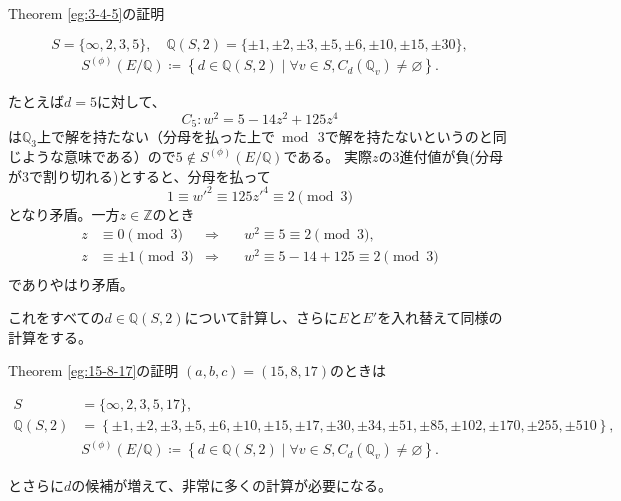 \documentclass{classes/mybeamer}
\begin{document}
\begin{frame}{Theorem \ref{eg:3-4-5}の証明}
    \begin{eg*}
        \begin{equation}
            S = \{\infty, 2, 3, 5\}, \quad
            \mathbb{Q}(S, 2) = \{\pm 1, \pm 2, \pm 3, \pm 5, \pm 6, \pm 10, \pm 15, \pm 30\},
        \end{equation}
        \begin{align}
            S^{(\phi)}(E/\mathbb{Q}) \coloneq \left\{ d\in \mathbb{Q}(S,2) \mid \forall v \in S, C_d(\mathbb{Q}_v)\neq\varnothing \right\}.
        \end{align}
    \end{eg*}
    たとえば$d=5$に対して、
    \begin{equation}
        C_5: w^2 = 5 - 14z^2 + 125z^4
    \end{equation}
    は$\mathbb{Q}_3$上で解を持たない（分母を払った上で$\bmod\,3$で解を持たないというのと同じような意味である）ので$5\notin S^{(\phi)}(E/\mathbb{Q})$である。
    実際$z$の$3$進付値が負(分母が$3$で割り切れる)とすると、分母を払って
    \begin{equation}
        1 \equiv w'^2 \equiv 125z'^4 \equiv 2 \pmod 3
    \end{equation}
    となり矛盾。一方$z\in \mathbb{Z}$のとき
    \begin{equation}
        \begin{aligned}
            z & \equiv 0 \pmod 3     & \Rightarrow & \quad w^2 \equiv 5 \equiv 2 \pmod 3,          \\
            z & \equiv \pm 1 \pmod 3 & \Rightarrow & \quad w^2 \equiv 5 -14 +125 \equiv  2 \pmod 3 \\
        \end{aligned}
    \end{equation}
    でありやはり矛盾。

    これをすべての$d\in \mathbb{Q}(S,2)$について計算し、さらに$E$と$E'$を入れ替えて同様の計算をする。
\end{frame}

\begin{frame}{Theorem \ref{eg:15-8-17}の証明}
    $(a,b,c)=(15,8,17)$のときは
    \begin{eg*}
        \begin{equation}
            \begin{split}
                S &= \{\infty, 2, 3, 5, 17\}, \\
                \mathbb{Q}(S,2) &= \left\{\pm1, \pm2, \pm3, \pm 5, \pm6, \pm10, \pm15, \pm17, \pm30, \pm34, \pm 51, \pm 85, \pm 102, \pm 170, \pm255, \pm510 \right\},
            \end{split}
        \end{equation}
        \begin{align}
            S^{(\phi)}(E/\mathbb{Q}) \coloneq \left\{ d\in \mathbb{Q}(S,2) \mid \forall v \in S, C_d(\mathbb{Q}_v)\neq\varnothing \right\}.
        \end{align}
    \end{eg*}
    とさらに$d$の候補が増えて、非常に多くの計算が必要になる。
\end{frame}
\end{document}
